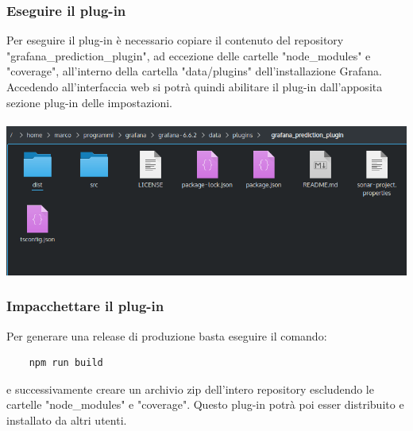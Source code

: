 \subsubsection{Eseguire il plug-in}%
Per eseguire il plug-in è necessario copiare il contenuto del repository "grafana\_prediction\_plugin", ad eccezione delle cartelle "node\_modules" e "coverage", all'interno della cartella "data/plugins" dell'installazione Grafana\glo. Accedendo all'interfaccia web si potrà quindi abilitare il plug-in dall'apposita sezione plug-in delle impostazioni.
\\
\\
\includegraphics[width=\textwidth,height=\textheight,keepaspectratio]{img/plugin-directory.png}

\subsubsection{Impacchettare il plug-in}%
Per generare una release di produzione basta eseguire il comando:
\begin{verbatim}
	npm run build	
\end{verbatim}
e successivamente creare un archivio zip dell'intero repository escludendo le cartelle "node\_modules" e "coverage". Questo plug-in potrà poi esser distribuito e installato da altri utenti. 
